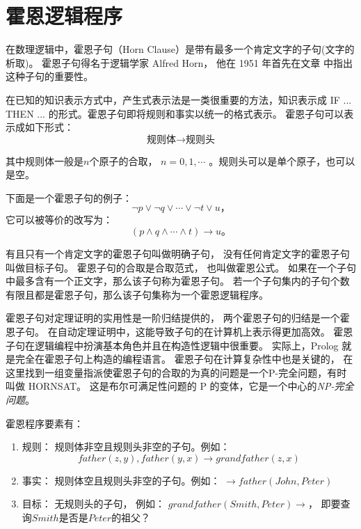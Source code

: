 \section{霍恩逻辑程序}
在数理逻辑中，霍恩子句（Horn Clause）是带有最多一个肯定文字的子句(文字的析取)。
霍恩子句得名于逻辑学家 Alfred Horn，
他在 1951 年首先在文章\cite{DBLP:journals/jsyml/Horn51} 中指出这种子句的重要性。

在已知的知识表示方式中，产生式表示法是一类很重要的方法，知识表示成
{\ttfamily IF ... THEN ... }的形式。霍恩子句即将规则和事实以统一的格式表示。
霍恩子句可以表示成如下形式：
\begin{equation*}
        \text{规则体} \rightarrow \text{规则头}
\end{equation*}

其中规则体一般是$n$个原子的合取， $n=0, 1, \cdots$ 。规则头可以是单个原子，也可以是空。

下面是一个霍恩子句的例子：
\begin{equation*}
        \lnot p \lor \lnot q \lor \cdots \lor \lnot t \lor u \text{，}
\end{equation*}
它可以被等价的改写为：
\begin{equation*}
        (p \land q \land \cdots \land t) \rightarrow u \text{。}
\end{equation*}

有且只有一个肯定文字的霍恩子句叫做明确子句， 没有任何肯定文字的霍恩子句叫做目标子句。
霍恩子句的合取是合取范式， 也叫做霍恩公式。
如果在一个子句中最多含有一个正文字，那么该子句称为霍恩子句。
若一个子句集内的子句个数有限且都是霍恩子句，那么该子句集称为一个霍恩逻辑程序。

霍恩子句对定理证明的实用性是一阶归结提供的，
两个霍恩子句的归结是一个霍恩子句。
在自动定理证明中，这能导致子句的在计算机上表示得更加高效。
霍恩子句在逻辑编程中扮演基本角色并且在构造性逻辑中很重要。
实际上，Prolog 就是完全在霍恩子句上构造的编程语言。
霍恩子句在计算复杂性中也是关键的，
在这里找到一组变量指派使霍恩子句的合取的为真的问题是一个P-完全问题，有时叫做 HORNSAT。
这是布尔可满足性问题的 P 的变体，它是一个中心的\emph{NP-完全问题}。

霍恩程序要素有：
\begin{enumerate}
        \item 规则： 规则体非空且规则头非空的子句。例如：
                \begin{equation*}
                        father(z,y), father(y,x) \rightarrow grandfather(z,x)
                \end{equation*}
        \item 事实： 规则体空且规则头非空的子句。例如： 
                $ \rightarrow father(John, Peter) $
        \item 目标： 无规则头的子句，
                例如： $ grandfather(Smith, Peter) \rightarrow\text{，} $
                即要查询$Smith$是否是$Peter$的祖父？
\end{enumerate}


